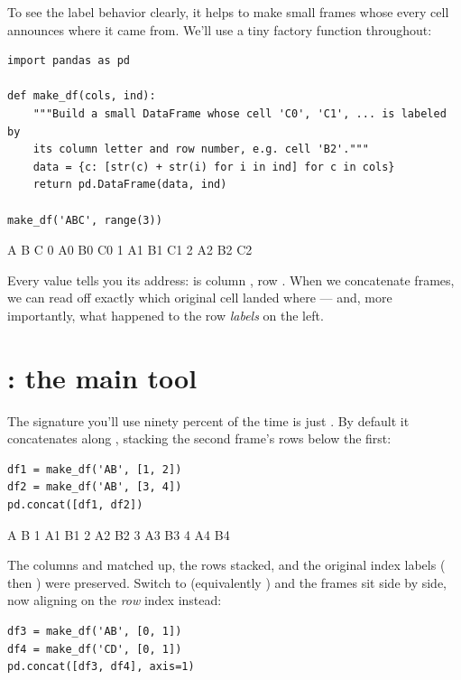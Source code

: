 \documentclass[11pt]{article}
\begin{document}
To see the label behavior clearly, it helps to make small frames whose every cell announces where it came from. We'll use a tiny factory function throughout:

\begin{lstlisting}
import pandas as pd

def make_df(cols, ind):
    """Build a small DataFrame whose cell 'C0', 'C1', ... is labeled by
    its column letter and row number, e.g. cell 'B2'."""
    data = {c: [str(c) + str(i) for i in ind] for c in cols}
    return pd.DataFrame(data, ind)

make_df('ABC', range(3))
\end{lstlisting}

\begin{outblock}
    A   B   C
0  A0  B0  C0
1  A1  B1  C1
2  A2  B2  C2
\end{outblock}

Every value tells you its address:  is column , row . When we concatenate frames, we can read off exactly which original cell landed where --- and, more importantly, what happened to the row \emph{labels} on the left.

\section{\texorpdfstring{}{pd.concat}: the main tool}

The signature you'll use ninety percent of the time is just . By default it concatenates along , stacking the second frame's rows below the first:

\begin{lstlisting}
df1 = make_df('AB', [1, 2])
df2 = make_df('AB', [3, 4])
pd.concat([df1, df2])
\end{lstlisting}

\begin{outblock}
    A   B
1  A1  B1
2  A2  B2
3  A3  B3
4  A4  B4
\end{outblock}

The columns  and  matched up, the rows stacked, and the original index labels ( then ) were preserved. Switch to  (equivalently ) and the frames sit side by side, now aligning on the \emph{row} index instead:

\begin{lstlisting}
df3 = make_df('AB', [0, 1])
df4 = make_df('CD', [0, 1])
pd.concat([df3, df4], axis=1)
\end{lstlisting}
\end{document}
